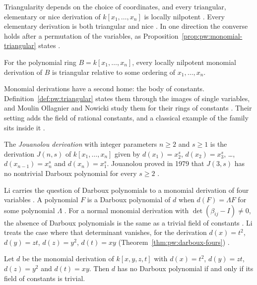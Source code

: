Triangularity depends on the choice of coordinates, and every triangular,
elementary or nice derivation of $k[x_{1},\dots,x_{n}]$ is locally
nilpotent \cite[p.~76]{Freudenburg2017}. Every elementary derivation is
both triangular and nice \cite[p.~76]{Freudenburg2017}. In one direction
the converse holds after a permutation of the variables, as
Proposition~\ref{prop:pw:monomial-triangular} states
\cite[p.~76]{Freudenburg2017}.

\begin{proposition}\label{prop:pw:monomial-triangular}
For the polynomial ring $B=k[x_{1},\dots,x_{n}]$, every locally nilpotent
monomial derivation of $B$ is triangular relative to some ordering of
$x_{1},\dots,x_{n}$.
\end{proposition}

Monomial derivations have a second home: the body of constants.
Definition~\ref{def:pw:triangular} states them through the images of
single variables, and Moulin Ollagnier and Nowicki study them for their
rings of constants \cite[p.~3138]{MoulinOllagnierNowicki2011}. Their
setting adds the field of rational constants, and a classical example of
the family sits inside it \cite[p.~3139]{MoulinOllagnierNowicki2011}.

\begin{example}\label{ex:pw:jouanolou}
The \emph{Jouanolou derivation} with integer parameters $n\geq 2$ and
$s\geq 1$ is the derivation $J(n,s)$ of $k[x_{1},\dots,x_{n}]$ given by
$d(x_{1})=x_{2}^{s}$, $d(x_{2})=x_{3}^{s}$, \dots, $d(x_{n-1})=x_{n}^{s}$
and $d(x_{n})=x_{1}^{s}$. Jouanolou proved in 1979 that $J(3,s)$ has no
nontrivial Darboux polynomial for every $s\geq 2$
\cite[p.~3139]{MoulinOllagnierNowicki2011}.
\end{example}

Li carries the question of Darboux polynomials to a monomial derivation of
four variables \cite[p.~1]{Li2015DarbouxMonomial}. A polynomial $F$ is a
Darboux polynomial of $d$ when $d(F)=\Lambda F$ for some polynomial
$\Lambda$ \cite[p.~1]{Li2015DarbouxMonomial}. For a normal monomial
derivation with $\det(\beta_{ij}-I)\neq 0$, the absence of Darboux
polynomials is the same as a trivial field of constants
\cite[p.~2]{Li2015DarbouxMonomial}. Li treats the case where that
determinant vanishes, for the derivation
$d(x)=t^{2}$, $d(y)=zt$, $d(z)=y^{2}$, $d(t)=xy$ (Theorem~\ref{thm:pw:darboux-fours})
\cite[p.~2]{Li2015DarbouxMonomial}.\begin{theorem}\label{thm:pw:darboux-fours}
Let $d$ be the monomial derivation of $k[x,y,z,t]$ with $d(x)=t^{2}$,
$d(y)=zt$, $d(z)=y^{2}$ and $d(t)=xy$. Then $d$ has no Darboux polynomial
if and only if its field of constants is trivial.
\end{theorem}

